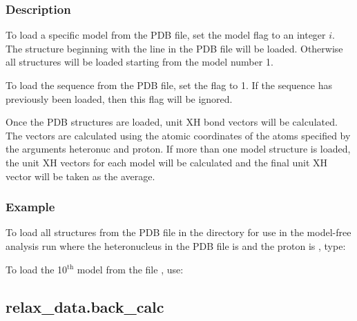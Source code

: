 \subsubsection{Description}

To load a specific model from the PDB file, set the model flag to an integer $i$.  The structure beginning with the line  in the PDB file will be loaded.  Otherwise all structures will be loaded starting from the model number 1.


To load the sequence from the PDB file, set the  flag to 1.  If the sequence has previously been loaded, then this flag will be ignored.


Once the PDB structures are loaded, unit XH bond vectors will be calculated.  The vectors are calculated using the atomic coordinates of the atoms specified by the arguments heteronuc and proton.  If more than one model structure is loaded, the unit XH vectors for each model will be calculated and the final unit XH vector will be taken as the average.



\subsubsection{Example}

To load all structures from the PDB file  in the directory  for use in the model-free analysis run  where the heteronucleus in the PDB file is  and the proton is , type:




To load the 10$^\mathrm{th}$ model from the file , use:






\newpage

\subsection{relax\_data.back\_calc}


